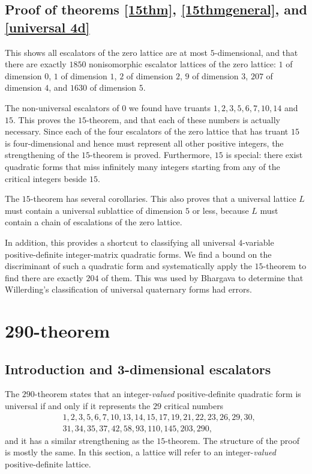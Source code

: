 \documentclass{article}
\begin{document}
\subsection{Proof of theorems \ref{15thm}, \ref{15thmgeneral}, and \ref{universal 4d}}
This shows all escalators of the zero lattice are at most $5$-dimensional, and that there are exactly $1850$ nonisomorphic escalator lattices of the zero lattice: $1$ of dimension $0$, $1$ of dimension $1$, $2$ of dimension $2$, $9$ of dimension $3$, $207$ of dimension $4$, and $1630$ of dimension $5$.

The non-universal escalators of $0$ we found have truants $1, 2, 3, 5, 6, 7, 10, 14$ and $15$. This proves the $15$-theorem, and that each of these numbers is actually necessary. Since each of the four escalators of the zero lattice that has truant $15$ is four-dimensional and hence must represent all other positive integers, the strengthening of the $15$-theorem is proved. Furthermore, $15$ is special: there exist quadratic forms that miss infinitely many integers starting from any of the critical integers beside $15$.

The $15$-theorem has several corollaries. This also proves that a universal lattice $L$ must contain a universal sublattice of dimension $5$ or less, because $L$ must contain a chain of escalations of the zero lattice.

In addition, this provides a shortcut to classifying all universal $4$-variable positive-definite integer-matrix quadratic forms. We find a bound on the discriminant of such a quadratic form and systematically apply the $15$-theorem to find there are exactly $204$ of them. This was used by Bhargava to determine that Willerding's classification of universal quaternary forms had errors.

\section{290-theorem}
\subsection{Introduction and 3-dimensional escalators}
The $290$-theorem \cite{twoninety} states that an integer-\emph{valued} positive-definite quadratic form is universal if and only if it represents the $29$ critical numbers
\[\begin{split}
    &1,2,3,5,6,7,10,13,14,15,17,19,21,22,23,26,29,30, \\
    &31,34,35,37,42,58,93,110,145,203,290,
\end{split}\] %
and it has a similar strengthening as the $15$-theorem.
The structure of the proof is mostly the same.
In this section, a lattice will refer to an integer-\emph{valued} positive-definite lattice.
\end{document}

